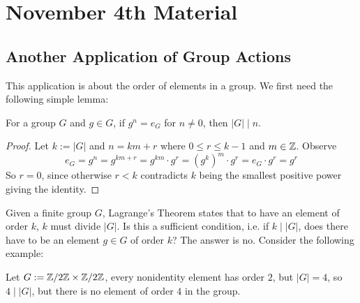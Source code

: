 \section{November 4th Material}

\subsection{Another Application of Group Actions}

This application is about the order of elements in a group. We first need the following simple lemma:

\begin{lemmabox}
    For a group $G$ and $g \in G$, if $g^n = e_G$ for $n \neq 0$, then $|G| \mid n$. 
\end{lemmabox}
\begin{proof}
    Let $k := |G|$ and $n = km + r$ where $0 \leq r \leq k - 1$ and $m \in \mathbb{Z}$. Observe 
    \[ e_G = g^n = g^{km+r} = g^{km}\cdot g^r = (g^k)^m \cdot g^r = e_G \cdot g^r = g^r \]
    So $r = 0$, since otherwise $r < k$ contradicts $k$ being the smallest positive power giving the identity.
\end{proof}

Given a finite group $G$, Lagrange's Theorem states that to have an element of order $k$, $k$ must divide $|G|$. Is this a sufficient condition, i.e. if $k \mid |G|$, does there have to be an element $g \in G$ of order $k$? The answer is no. Consider the following example:

\begin{example}
    Let $G := \mathbb{Z}/2\mathbb{Z} \times \mathbb{Z}/2\mathbb{Z}$, every nonidentity element has order $2$, but $|G| = 4$, so $4 \mid |G|$, but there is no element of order $4$ in the group.
\end{example}

